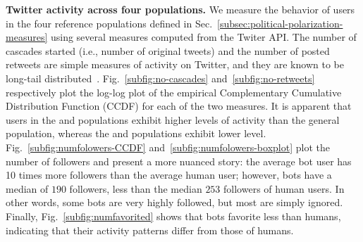 \textbf{Twitter activity across four populations.}
We measure the behavior of users in the four reference populations defined in Sec.~\ref{subsec:political-polarization-measures} using several measures computed from the Twiter API.
The number of cascades started (i.e., number of original tweets) and the number of posted retweets are simple measures of activity on Twitter, and they are known to be long-tail distributed~\cite{Cha2010}.
Fig.~\ref{subfig:no-cascades} and~\ref{subfig:no-retweets} respectively plot the log-log plot of the empirical Complementary Cumulative Distribution Function (CCDF) for each of the two measures.
It is apparent that users in the \Bot and \Suspended populations exhibit higher levels of activity than the general population, whereas the \Human and \Protected populations exhibit lower level.
Fig.~\ref{subfig:numfolowers-CCDF} and~\ref{subfig:numfolowers-boxplot} plot the number of followers and present a more nuanced story:
the average bot user has 10 times more followers than the average human user;
however, bots have a median of $190$ followers, less than the median $253$ followers of human users.
In other words, some bots are very highly followed, but most are simply ignored.
Finally, Fig.~\ref{subfig:numfavorited} shows that bots favorite less than humans, indicating that their activity patterns differ from those of humans.
%
%
